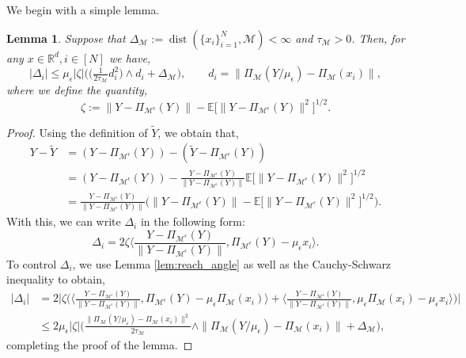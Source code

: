 \documentclass[10pt]{article}
\theoremstyle{plain}
\newtheorem{lemma}[theorem]{Lemma}
\theoremstyle{definition}
\theoremstyle{remark}
\newcommand{\M}{{\mathcal{M}}}
\newcommand{\R}{\mathbb{R}}
\newcommand{\E}{\mathbb{E}}
\newcommand{\Pieps}{\Pi_{\M^\epsilon}}
\newcommand{\dist}{\operatorname{dist}}
\newcommand{\gap}{\Delta_\M}
\begin{document}
We begin with a simple lemma.

\begin{lemma}\label{lem:simple_delta_bound}
Suppose that \(\gap := \dist(\{x_i\}_{i=1}^N, \M) < \infty\) and \(\tau_\M > 0\). Then, for any \(x \in \R^d, i \in [N]\) we have,
\begin{equation*}
    |\Delta_i| \leq \mu_\epsilon |\zeta| \Big ( \Big ( \tfrac{1}{2 \tau_\M} d_i^2 \Big ) \wedge d_i + \gap \Big ), \qquad d_i = \| \Pi_\M(Y/\mu_\epsilon) - \Pi_\M(x_i)\|,
\end{equation*}
where we define the quantity,
\begin{equation*}
    \zeta := \|Y - \Pieps(Y)\| - \E \Big [ \|Y - \Pieps(Y)\|^2 \Big ]^{1/2}.
\end{equation*}
\end{lemma}
\begin{proof}
Using the definition of \(\tilde{Y}\), we obtain that,
\begin{align*}
    Y - \tilde{Y} &= (Y - \Pieps(Y)) - (\tilde{Y} - \Pieps(Y))\\
    &= (Y - \Pieps(Y)) - \frac{Y - \Pieps(Y)}{\|Y - \Pieps(Y)\|}\E \Big [ \|Y - \Pieps(Y)\|^2 \Big ]^{1/2}\\
    &= \frac{Y - \Pieps(Y)}{\|Y - \Pieps(Y)\|} \bigg ( \|Y - \Pieps(Y)\| - \E \Big [ \|Y - \Pieps(Y)\|^2 \Big ]^{1/2} \bigg ).
\end{align*}
With this, we can write \(\Delta_i\) in the following form:
\begin{equation}\label{eq:drbg_1}
    \Delta_i = 2 \zeta \bigg \langle \frac{Y - \Pieps(Y)}{\|Y - \Pieps(Y)\|}, \Pieps(Y) - \mu_\epsilon x_i \bigg \rangle.
\end{equation}
To control \(\Delta_i\), we use Lemma \ref{lem:reach_angle} as well as the Cauchy-Schwarz inequality to obtain, 
\begin{align}
    |\Delta_i| &= 2 \bigg | \zeta \bigg ( \bigg \langle \frac{Y - \Pieps(Y)}{\|Y - \Pieps(Y)\|}, \Pieps(Y) - \mu_\epsilon \Pi_\M(x_i) \bigg \rangle + \bigg \langle \frac{Y - \Pieps(Y)}{\|Y - \Pieps(Y)\|}, \mu_\epsilon \Pi_\M(x_i) - \mu_\epsilon x_i \bigg \rangle \bigg ) \bigg | \nonumber\\
    &\leq 2 \mu_\epsilon |\zeta| \bigg (\frac{\| \Pi_\M(Y/\mu_\epsilon) - \Pi_\M(x_i) \|^2}{2\tau_\M} \wedge \| \Pi_\M(Y/\mu_\epsilon) - \Pi_\M(x_i) \| + \gap \bigg ),\label{eq:drbg_1h}
\end{align}
completing the proof of the lemma.
\end{proof}
\end{document}
